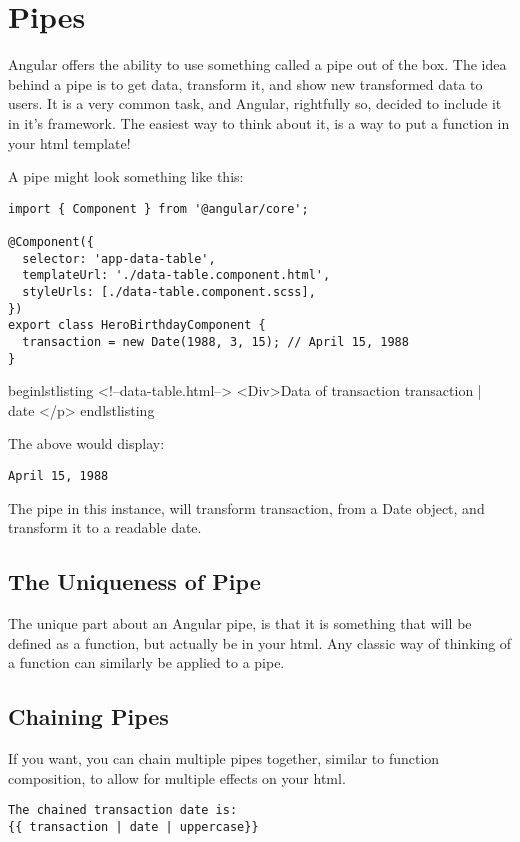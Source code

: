 \section{ Pipes }


Angular offers the ability to use something called a pipe out of the box. The
idea behind a pipe is to get data, transform it, and show new transformed data
to users. It is a very common task, and Angular, rightfully so, decided to
include it in it's framework. The easiest way to think about it, is a way
to put a function in your html template!

A pipe might look something like this:

\begin{lstlisting}
import { Component } from '@angular/core';

@Component({
  selector: 'app-data-table',
  templateUrl: './data-table.component.html',
  styleUrls: [./data-table.component.scss],
})
export class HeroBirthdayComponent {
  transaction = new Date(1988, 3, 15); // April 15, 1988
}
\end{lstlisting}

begin{lstlisting}
<!--data-table.html-->
<Div>Data of transaction {{ transaction | date }}</p>
end{lstlisting}

The above would display:
\begin{verbatim}
April 15, 1988
\end{verbatim}

The pipe in this instance, will transform transaction, from a Date object, and
transform it to a readable date.

\subsection{ The Uniqueness of Pipe }
The unique part about an Angular pipe, is that it is something that will be
defined as a function, but actually be in your html. Any classic way of
thinking of a function can similarly be applied to a pipe.

\subsection{Chaining Pipes}
If you want, you can chain multiple pipes together, similar to function
composition, to allow for multiple effects on your html.

\begin{lstlisting}
The chained transaction date is:
{{ transaction | date | uppercase}}
\end{lstlisting}

